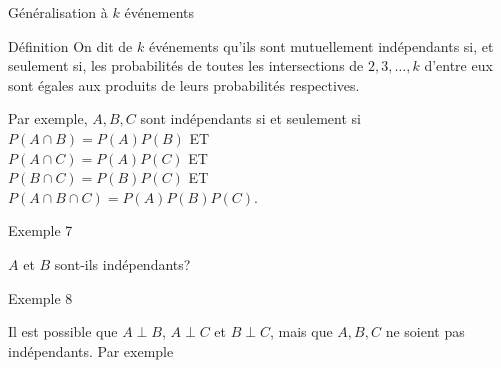 \documentclass{BeamerTemplate}
\begin{document}
\begin{frame}[t]{Généralisation à $k$ événements}
 \begin{Boite}{Définition}
  On dit de $k$ événements qu'ils sont \alert{mutuellement
  indépendants} si, et seulement si, les probabilités de
  \alert{toutes} les intersections de $2,3,\ldots,k$ d'entre
  eux sont égales aux produits de leurs probabilités
  respectives.
 \end{Boite}

 \medskip
 Par exemple, $A,B,C$ sont indépendants si et seulement si \\
 $P(A\cap B)=P(A)P(B)$ ET \\
 $P(A\cap C)=P(A)P(C)$ ET \\
 $P(B\cap C)=P(B)P(C)$ ET \\
 $P(A\cap B\cap C)=P(A)P(B)P(C)$.
\end{frame}

\begin{frame}[t]{Exemple 7}

$A$ et $B$ sont-ils indépendants?

\begin{center}
\end{center}

\end{frame}

\begin{frame}[t]{Exemple 8}

Il est possible que $A\perp B$, $A\perp C$ et $B\perp C$, mais
que $A,B,C$ ne
soient pas indépendants. Par exemple

\begin{center}
\end{center}

\end{frame}
\end{document}
